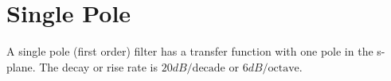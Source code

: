 \section{Single Pole}
A single pole (first order) filter has a transfer function with
one pole in the s-plane. The decay or rise rate is \(20 dB/\text{decade}\)
or \(6 dB/\text{octave}\).



